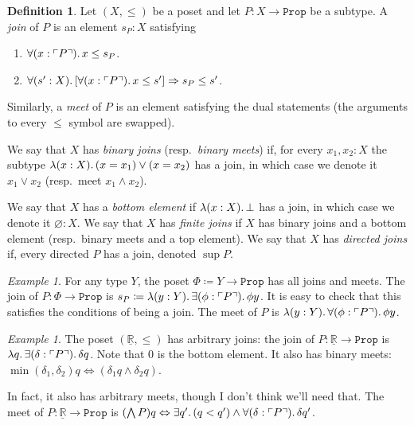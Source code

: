 \documentclass[11pt, oneside, article]{memoir}
\theoremstyle{plain}
\theoremstyle{definition}
\newtheorem{definition}[theorem]{Definition}
\theoremstyle{remark}
\newtheorem{example}[theorem]{Example}
\DeclarePairedDelimiter{\subtype}{\ulcorner}{\urcorner}
\newcommand{\const}[1]{\mathtt{#1}}
\newcommand{\ul}[1]{\underline{#1}}
\newcommand{\LR}{\ul{\mathbb{R}}}
\newcommand{\Prop}{\const{Prop}}
\newcommand{\imp}{\Rightarrow}
\renewcommand{\iff}{\Leftrightarrow}
\begin{document}
\begin{definition}
Let $(X,\leq)$ be a poset and let $P:X\to\Prop$ be a subtype. A \emph{join} of $P$ is an element $s_P:X$ satisfying
\begin{enumerate}
	\item $\forall(x:\subtype{P})\ldotp x\leq s_P$.
	\item $\forall(s':X)\ldotp[\forall(x:\subtype{P})\ldotp x\leq s']\imp s_P\leq s'$.
\end{enumerate}
Similarly, a \emph{meet} of $P$ is an element satisfying the dual statements (the arguments to every $\leq$ symbol are swapped).

We say that $X$ has \emph{binary joins} (resp.\ \emph{binary meets}) if, for every $x_1,x_2:X$ the subtype $\lambda(x:X)\ldotp (x=x_1) \vee (x=x_2)$ has a join, in which case we denote it $x_1\vee x_2$ (resp.\ meet $x_1\wedge x_2$). 

We say that $X$ has a \emph{bottom element} if $\lambda(x:X)\ldotp \bot$ has a join, in which case we denote it $\varnothing:X$. We say that $X$ has \emph{finite joins} if $X$ has binary joins and a bottom element (resp.\ binary meets and a top element). We say that $X$ has \emph{directed joins} if, every directed $P$ has a join, denoted $\sup P$.
\end{definition}

\begin{example}
For any type $Y$, the poset $\Phi\coloneqq Y\to\Prop$ has all joins and meets. The join of $P:\Phi\to\Prop$ is $s_P\coloneqq\lambda(y:Y)\ldotp\exists(\phi:\subtype{P})\ldotp\phi y$. It is easy to check that this satisfies the conditions of being a join. The meet of $P$ is $\lambda(y:Y)\ldotp\forall(\phi:\subtype{P})\ldotp\phi y$.
\end{example}

\begin{example}
The poset $(\LR,\leq)$ has arbitrary joins: the join of $P:\LR\to\Prop$ is $\lambda q\ldotp\exists(\delta:\subtype{P})\ldotp\delta q$. Note that $0$ is the bottom element. It also has binary meets: $\min(\delta_1,\delta_2)q\iff(\delta_1 q\wedge \delta_2q)$.

In fact, it also has arbitrary meets, though I don't think we'll need that. The meet of $P:\LR\to\Prop$ is $(\bigwedge P)q\iff\exists q'\ldotp (q<q')\wedge\forall(\delta:\subtype{P})\ldotp\delta q'$.
\end{example}
\end{document}
